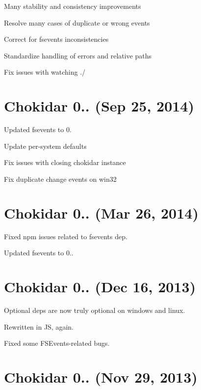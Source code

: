 \begin{DoxyItemize}
\item Many stability and consistency improvements
\item Resolve many cases of duplicate or wrong events
\item Correct for fsevents inconsistencies
\item Standardize handling of errors and relative paths
\item Fix issues with watching {\ttfamily ./}
\end{DoxyItemize}

\section*{Chokidar 0.. (Sep 25, 2014)}


\begin{DoxyItemize}
\item Updated fsevents to 0.
\item Update per-\/system defaults
\item Fix issues with closing chokidar instance
\item Fix duplicate change events on win32
\end{DoxyItemize}

\section*{Chokidar 0.. (Mar 26, 2014)}


\begin{DoxyItemize}
\item Fixed npm issues related to fsevents dep.
\item Updated fsevents to 0..
\end{DoxyItemize}

\section*{Chokidar 0.. (Dec 16, 2013)}


\begin{DoxyItemize}
\item Optional deps are now truly optional on windows and linux.
\item Rewritten in JS, again.
\item Fixed some F\+S\+Events-\/related bugs.
\end{DoxyItemize}

\section*{Chokidar 0.. (Nov 29, 2013)}


